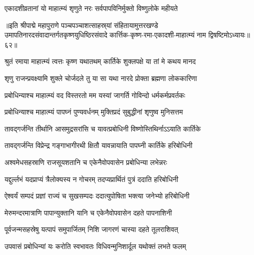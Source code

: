 \twolineshloka
{एकादशीव्रतानां यो माहात्म्यं शृणुते नरः}
{सर्वपापविनिर्मुक्तो विष्णुलोके महीयते}%

॥इति श्रीपाद्मे महापुराणे पञ्चपञ्चाशत्साहस्र्यां संहितायामुत्तरखण्डे उमापतिनारदसंवादान्तर्गतकृष्णयुधिष्ठिरसंवादे कार्त्तिक-कृष्ण-रमा-एकादशी-माहात्म्यं नाम द्विषष्टिमोऽध्यायः॥६२॥


\hyperref[sec:ekadashi_mahatmyam_padma_puranam]{\closesub}
\clearpage

\label{sec:padma-karttika-shukla-prabodhini}



\twolineshloka
{श्रुतं रमाया माहात्म्यं त्वत्तः कृष्ण यथातथम्}
{कार्तिके शुक्लपक्षे या तां मे कथय मानद}%


\twolineshloka
{शृणु राजन्प्रवक्ष्यामि शुक्ले चोर्जदले तु या}
{सा यथा नारदे प्रोक्ता ब्रह्मणा लोककारिणा}%


\twolineshloka
{प्रबोधिन्याश्च माहात्म्यं वद विस्तरतो मम}
{यस्यां जागर्ति गोविन्दो धर्मकर्मप्रवर्तकः}%


\twolineshloka
{प्रबोधिन्याश्च माहात्म्यं पापघ्नं पुण्यवर्धनम्}
{मुक्तिप्रदं सुबुद्धीनां शृणुष्व मुनिसत्तम}%

\twolineshloka
{तावद्गर्जन्ति तीर्थानि आसमुद्रसरांसि च}
{यावत्प्रबोधिनी विष्णोस्तिथिर्नाऽऽयाति कार्तिके}%

\twolineshloka
{तावद्गर्जन्ति विप्रेन्द्र गङ्गाभागीरथी क्षितौ}
{यावन्नायाति पापघ्नी कार्तिके हरिबोधिनी}%

\twolineshloka
{अश्वमेधसहस्राणि राजसूयशतानि च}
{एकेनैवोपवासेन प्रबोधिन्या लभेन्नरः}%

\twolineshloka
{यद्दुर्ल्लभं यदप्राप्यं त्रैलोक्यस्य न गोचरम्}
{तदप्यप्रार्थितं पुत्रं ददाति हरिबोधिनी}%

\twolineshloka
{ऐश्वर्यं सम्पदं प्रज्ञां राज्यं च सुखसम्पदः}
{ददात्युपोषिता भक्त्या जनेभ्यो हरिबोधिनी}%

\twolineshloka
{मेरुमन्दरमात्राणि पापान्युक्तानि यानि च}
{एकेनैवोपवासेन दहते पापनाशिनी}%

\twolineshloka
{पूर्वजन्मसहस्रेषु यत्पापं समुपार्जितम्}
{निशि जागरणं चास्या दहते तूलराशिवत्}%

\twolineshloka
{उपवासं प्रबोधिन्यां यः करोति स्वभावतः}
{विधिवन्मुनिशार्दूल यथोक्तं लभते फलम्}%

